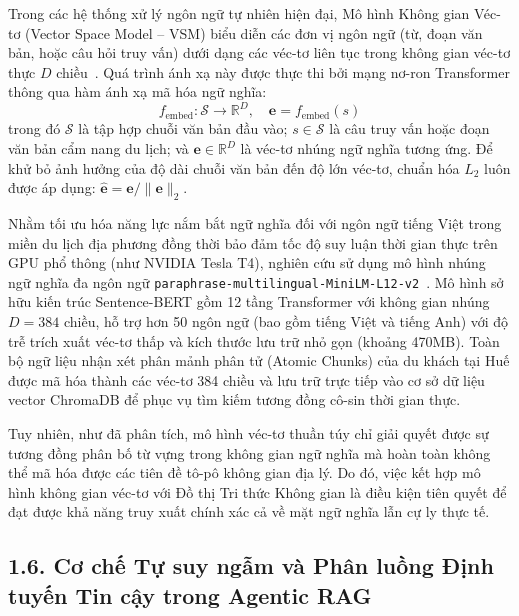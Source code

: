 Trong các hệ thống xử lý ngôn ngữ tự nhiên hiện đại, Mô hình Không gian Véc-tơ (Vector Space Model -- VSM) biểu diễn các đơn vị ngôn ngữ (từ, đoạn văn bản, hoặc câu hỏi truy vấn) dưới dạng các véc-tơ liên tục trong không gian véc-tơ thực $D$ chiều~\cite{reimers2019sentencebert}. Quá trình ánh xạ này được thực thi bởi mạng nơ-ron Transformer thông qua hàm ánh xạ mã hóa ngữ nghĩa:
\begin{equation}
    f_{\text{embed}}: \mathcal{S} \to \mathbb{R}^D, \quad \mathbf{e} = f_{\text{embed}}(s)
    \label{eq:embedding-func}
\end{equation}
trong đó $\mathcal{S}$ là tập hợp chuỗi văn bản đầu vào; $s \in \mathcal{S}$ là câu truy vấn hoặc đoạn văn bản cẩm nang du lịch; và $\mathbf{e} \in \mathbb{R}^D$ là véc-tơ nhúng ngữ nghĩa tương ứng. Để khử bỏ ảnh hưởng của độ dài chuỗi văn bản đến độ lớn véc-tơ, chuẩn hóa $L_2$ luôn được áp dụng: $\hat{\mathbf{e}} = \mathbf{e} / \|\mathbf{e}\|_2$.

Nhằm tối ưu hóa năng lực nắm bắt ngữ nghĩa đối với ngôn ngữ tiếng Việt trong miền du lịch địa phương đồng thời bảo đảm tốc độ suy luận thời gian thực trên GPU phổ thông (như NVIDIA Tesla T4), nghiên cứu sử dụng mô hình nhúng ngữ nghĩa đa ngôn ngữ \texttt{paraphrase-\allowbreak multilingual-\allowbreak MiniLM-\allowbreak L12-\allowbreak v2}~\cite{reimers2019sentencebert}. Mô hình sở hữu kiến trúc Sentence-BERT gồm 12 tầng Transformer với không gian nhúng $D = 384$ chiều, hỗ trợ hơn 50 ngôn ngữ (bao gồm tiếng Việt và tiếng Anh) với độ trễ trích xuất véc-tơ thấp và kích thước lưu trữ nhỏ gọn (khoảng 470MB). Toàn bộ ngữ liệu nhận xét phân mảnh phân tử (Atomic Chunks) của du khách tại Huế được mã hóa thành các véc-tơ 384 chiều và lưu trữ trực tiếp vào cơ sở dữ liệu vector ChromaDB để phục vụ tìm kiếm tương đồng cô-sin thời gian thực.

Tuy nhiên, như đã phân tích, mô hình véc-tơ thuần túy chỉ giải quyết được sự tương đồng phân bố từ vựng trong không gian ngữ nghĩa mà hoàn toàn không thể mã hóa được các tiên đề tô-pô không gian địa lý. Do đó, việc kết hợp mô hình không gian véc-tơ với Đồ thị Tri thức Không gian là điều kiện tiên quyết để đạt được khả năng truy xuất chính xác cả về mặt ngữ nghĩa lẫn cự ly thực tế.

\subsection*{1.6. Cơ chế Tự suy ngẫm và Phân luồng Định tuyến Tin cậy trong Agentic RAG}
{}

